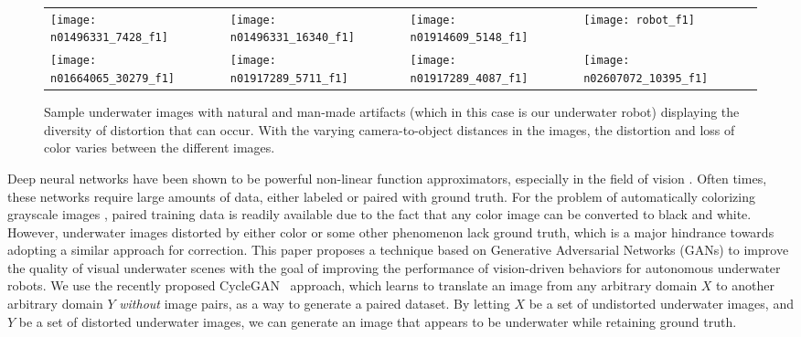 \begin{figure}
\vspace{2mm}
\centering
\begin{tabular}{p{1.7cm} p{1.7cm} p{1.7cm} p{1.7cm}}
   
   \texttt{[image: n01496331\_7428\_f1]} &
   \texttt{[image: n01496331\_16340\_f1]} &
   \texttt{[image: n01914609\_5148\_f1]} &
   \texttt{[image: robot\_f1]} \\
   \texttt{[image: n01664065\_30279\_f1]} &
   \texttt{[image: n01917289\_5711\_f1]} &
   \texttt{[image: n01917289\_4087\_f1]} &
   \texttt{[image: n02607072\_10395\_f1]} \\
\end{tabular}
\label{fig:samples}
\caption{Sample underwater images with natural and man-made artifacts (which in this case is our underwater robot) displaying the 
diversity of distortion that can occur. With the varying camera-to-object distances in the images, the distortion and loss of 
color varies between the different images.}
\vspace{-5mm}
\end{figure}

Deep neural networks have been shown to be powerful non-linear function approximators, especially in the field of vision 
\cite{krizhevsky2012imagenet}. Often times, these networks require large amounts of data, either labeled or paired with
ground truth. For the problem of automatically colorizing grayscale images \cite{zhang2016colorful}, paired training
data is
readily available due to the fact that any color image can be converted to black and white. However, underwater images distorted 
by either
color or some other phenomenon lack ground truth, which is a major hindrance towards adopting a similar approach for correction. 
This paper proposes a technique based on Generative Adversarial Networks (GANs) to improve the quality of visual underwater scenes 
with the goal of improving the performance of vision-driven behaviors for autonomous underwater robots.
We use the recently proposed CycleGAN~\cite{zhu2017unpaired} approach, which learns to translate an image from any arbitrary 
domain $X$ to another arbitrary domain $Y$ \textit{without} image pairs, as a way to generate a paired dataset.
By letting $X$ be a set of undistorted underwater images, and
$Y$ be a set of distorted underwater images, we can generate an image that appears to be underwater while retaining
ground truth.
